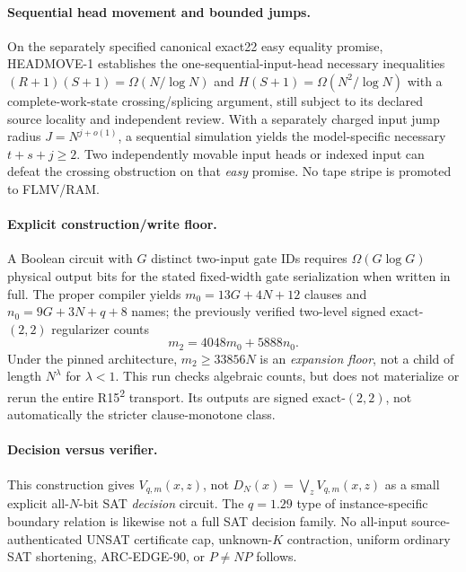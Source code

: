 \documentclass[11pt]{article}
\begin{document}
\paragraph{Sequential head movement and bounded jumps.}
On the separately specified canonical exact22 easy equality
promise, HEADMOVE-1 establishes the one-sequential-input-head
necessary inequalities
$(R+1)(S+1)=\Omega(N/\log N)$ and
$H(S+1)=\Omega(N^2/\log N)$ with a complete-work-state
crossing/splicing argument, still subject to its declared
source locality and independent review. With a separately
charged input jump radius $J=N^{j+o(1)}$, a sequential
simulation yields the model-specific necessary
$t+s+j\ge2$. Two independently movable input heads or indexed
input can defeat the crossing obstruction on that
\emph{easy} promise. No tape stripe is promoted to FLMV/RAM.

\paragraph{Explicit construction/write floor.}
A Boolean circuit with $G$ distinct two-input gate IDs
requires $\Omega(G\log G)$ physical output bits for the
stated fixed-width gate serialization when written in full.
The proper compiler yields $m_0=13G+4N+12$ clauses and
$n_0=9G+3N+q+8$ names; the previously verified two-level
signed exact-$(2,2)$ regularizer counts
\[
     m_2=4048m_0+5888n_0.                               \tag{14}
\]
Under the pinned architecture, $m_2\ge33856N$ is an
\emph{expansion floor}, not a child of length $N^\lambda$
for $\lambda<1$. This run checks algebraic counts, but does not
materialize or rerun the entire R15\textsuperscript{2} transport.
Its outputs are signed exact-$(2,2)$, not automatically the
stricter clause-monotone class.

\paragraph{Decision versus verifier.}
This construction gives $V_{q,m}(x,z)$, not
$D_N(x)=\bigvee_zV_{q,m}(x,z)$ as a small explicit
all-$N$-bit SAT \emph{decision} circuit. The $q=1.29$ type
of instance-specific boundary relation is likewise not a
full SAT decision family. No all-input source-authenticated
UNSAT certificate cap, unknown-$K$ contraction, uniform ordinary
SAT shortening, ARC-EDGE-90, or $P\ne NP$ follows.
\end{document}
